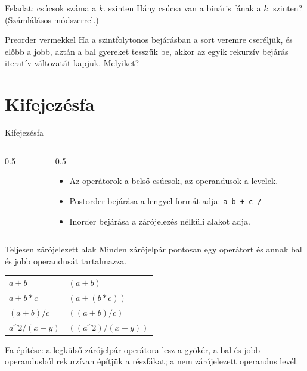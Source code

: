 \documentclass[hungarian]{beamer}
\begin{document}
\begin{frame}[t]{Feladat: csúcsok száma a $k$. szinten}
Hány csúcsa van a bináris fának a $k$. szinten? (Számlálásos módszerrel.)
\end{frame}

\begin{frame}{Preorder vermekkel}
Ha a szintfolytonos bejárásban a sort veremre cseréljük, és előbb a jobb, aztán a bal gyereket tesszük be, akkor az egyik rekurzív bejárás iteratív változatát kapjuk. Melyiket?
\end{frame}

\section{Kifejezésfa}

\begin{frame}{Kifejezésfa}
\begin{columns}
\begin{column}{0.5\linewidth}
\end{column}
\begin{column}{0.5\linewidth}
\begin{itemize}
    \item Az operátorok a belső csúcsok, az operandusok a levelek.
    \item Postorder bejárása a lengyel formát adja: \texttt{a b + c /}
    \item Inorder bejárása a zárójelezés nélküli alakot adja.
\end{itemize}
\end{column}
\end{columns}
\end{frame}

\begin{frame}{Teljesen zárójelezett alak}
Minden zárójelpár pontosan egy operátort és annak bal és jobb operandusát tartalmazza.

\vspace{2mm}
\begin{tabular}{ll}
$a+b$ & $(a+b)$\\
$a+b*c$ & $(a+(b*c))$\\
$(a+b)/c$ & $((a+b)/c)$\\
$a\text{\textasciicircum}2/(x-y)$ & $((a\text{\textasciicircum}2)/(x-y))$\\
\end{tabular}

\vspace{2mm}
Fa építése: a legkülső zárójelpár operátora lesz a gyökér, a bal és jobb operandusból rekurzívan építjük a részfákat; a nem zárójelezett operandus levél.
\end{frame}
\end{document}
